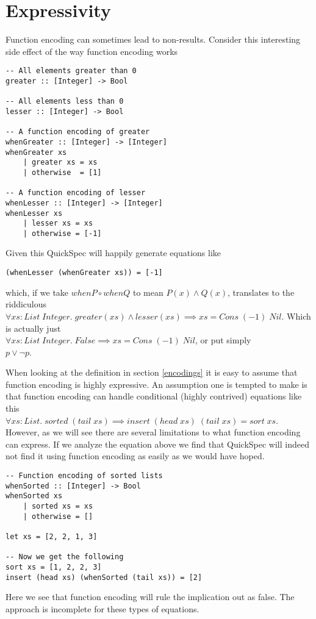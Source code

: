 \section{Expressivity}

Function encoding can sometimes lead to non-results. Consider this interesting side effect of the way function encoding
works
\begin{verbatim}-- All elements greater than 0
greater :: [Integer] -> Bool

-- All elements less than 0 
lesser :: [Integer] -> Bool

-- A function encoding of greater
whenGreater :: [Integer] -> [Integer]
whenGreater xs
    | greater xs = xs
    | otherwise  = [1]

-- A function encoding of lesser 
whenLesser :: [Integer] -> [Integer]
whenLesser xs
    | lesser xs = xs
    | otherwise = [-1]\end{verbatim}
Given this QuickSpec will happily generate equations like
\begin{verbatim}(whenLesser (whenGreater xs)) = [-1]\end{verbatim}
which, if we take $whenP\circ whenQ$ to mean $P(x)\wedge Q(x)$,  translates to the riddiculous\\
$\forall xs : List\; Integer.\; greater(xs)\wedge lesser(xs)\implies xs = Cons\; (-1)\; Nil$.
Which is actually just\\$\forall xs : List\; Integer.\; False\implies xs = Cons\; (-1)\; Nil$,
or put simply\\$p\vee \neg p$.

When looking at the definition in 
section \ref{encodings} it is easy to assume
that function encoding is highly expressive.
An assumption one is tempted to make is that
function encoding can handle conditional (highly contrived)
equations like this\\
$\forall xs : List.\;sorted\;(tail\; xs) \implies insert\;(head\;xs)\;(tail\;xs)=sort\;xs$.
However, as we will see there are several limitations to what function encoding can express.
If we analyze the equation above we find that QuickSpec will indeed not find it
using function encoding as easily as we would have hoped.
\begin{verbatim}-- Function encoding of sorted lists
whenSorted :: [Integer] -> Bool
whenSorted xs
    | sorted xs = xs
    | otherwise = []

let xs = [2, 2, 1, 3]

-- Now we get the following
sort xs = [1, 2, 2, 3]
insert (head xs) (whenSorted (tail xs)) = [2]\end{verbatim}
Here we see that function encoding will rule the implication out as false. The approach is
incomplete for these types of equations.

